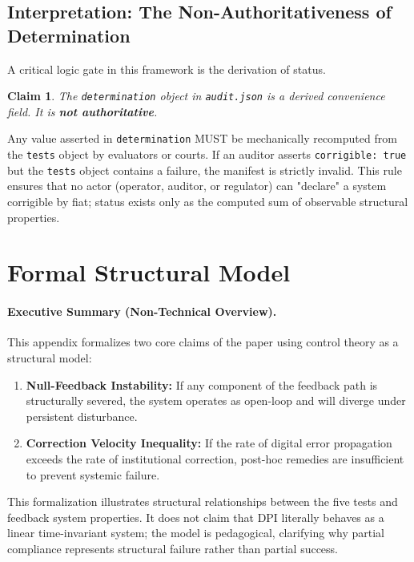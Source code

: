 \documentclass{article}
\newtheorem{claim}{Claim}
\begin{document}
\subsection{Interpretation: The Non-Authoritativeness of Determination}

A critical logic gate in this framework is the derivation of status.

\begin{claim}
The \texttt{determination} object in \texttt{audit.json} is a derived convenience field. It is \textbf{not authoritative}.
\end{claim}

Any value asserted in \texttt{determination} MUST be mechanically recomputed from the \texttt{tests} object by evaluators or courts. If an auditor asserts \texttt{corrigible: true} but the \texttt{tests} object contains a failure, the manifest is strictly invalid. This rule ensures that no actor (operator, auditor, or regulator) can "declare" a system corrigible by fiat; status exists only as the computed sum of observable structural properties.

\section{Formal Structural Model}
\label{appendix:proofs}

\paragraph{Executive Summary (Non-Technical Overview).}
This appendix formalizes two core claims of the paper using control theory as a structural model:
\begin{enumerate}[noitemsep]
    \item \textbf{Null-Feedback Instability:} If any component of the feedback path is structurally severed, the system operates as open-loop and will diverge under persistent disturbance.
    \item \textbf{Correction Velocity Inequality:} If the rate of digital error propagation exceeds the rate of institutional correction, post-hoc remedies are insufficient to prevent systemic failure.
\end{enumerate}
This formalization illustrates structural relationships between the five tests and feedback system properties. It does not claim that DPI literally behaves as a linear time-invariant system; the model is pedagogical, clarifying why partial compliance represents structural failure rather than partial success.
\end{document}
